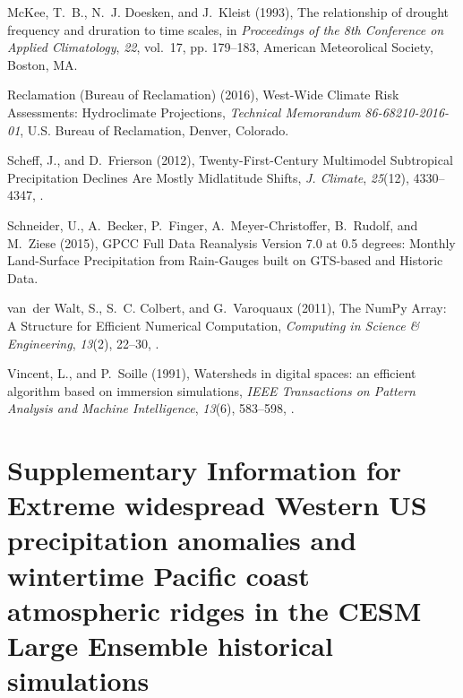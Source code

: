 \documentclass[final, double]{ua-thesis}
\begin{document}
\begin{thebibliography}{}
McKee, T.~B., N.~J. Doesken, and J.~Kleist (1993), The relationship of drought
  frequency and druration to time scales, in \textit{Proceedings of the 8th
  {Conference} on {Applied} {Climatology}}, \textit{22}, vol.~17, pp. 179--183,
  American Meteorolical Society, Boston, MA.

{Reclamation (Bureau of Reclamation)} (2016), West-{Wide} {Climate} {Risk} {Assessments}:
  {Hydroclimate} {Projections}, \textit{Technical {Memorandum}
  86-68210-2016-01}, U.S. Bureau of Reclamation, Denver, Colorado.

Scheff, J., and D.~Frierson (2012), Twenty-{First}-{Century} {Multimodel}
  {Subtropical} {Precipitation} {Declines} {Are} {Mostly} {Midlatitude}
  {Shifts}, \textit{J. Climate}, \textit{25}(12), 4330--4347,
  .

Schneider, U., A.~Becker, P.~Finger, A.~Meyer-Christoffer, B.~Rudolf, and
  M.~Ziese (2015), {GPCC} {Full} {Data} {Reanalysis} {Version} 7.0 at 0.5
  degrees: {Monthly} {Land}-{Surface} {Precipitation} from {Rain}-{Gauges}
  built on {GTS}-based and {Historic} {Data}.

van~der Walt, S., S.~C. Colbert, and G.~Varoquaux (2011), The {NumPy} {Array}:
  {A} {Structure} for {Efficient} {Numerical} {Computation}, \textit{Computing
  in Science \& Engineering}, \textit{13}(2), 22--30,
  .

Vincent, L., and P.~Soille (1991), Watersheds in digital spaces: an efficient
  algorithm based on immersion simulations, \textit{IEEE Transactions on
  Pattern Analysis and Machine Intelligence}, \textit{13}(6), 583--598,
  .

\end{thebibliography}

\chapter{Supplementary Information for Extreme widespread Western US precipitation anomalies and wintertime Pacific coast atmospheric ridges in the CESM Large Ensemble historical simulations}
\end{document}
